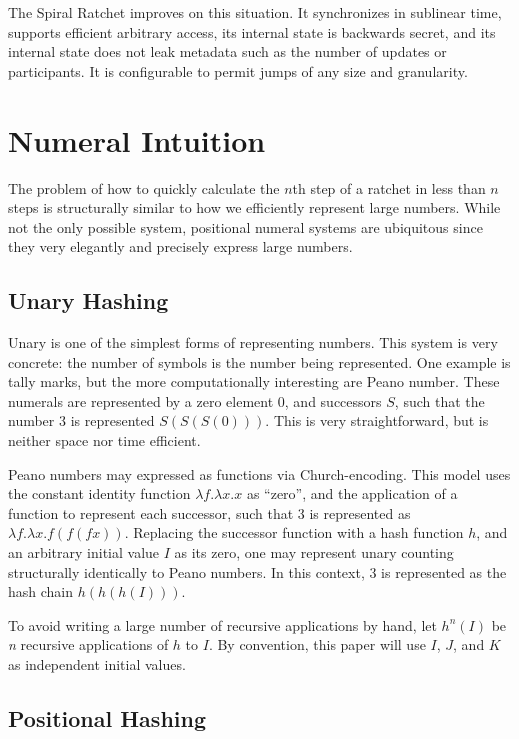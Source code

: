 \documentclass{article}
\begin{document}
    The Spiral Ratchet improves on this situation. It synchronizes in sublinear time, supports efficient arbitrary access, its internal state is backwards secret, and its internal state does not leak metadata such as the number of updates or participants. It is configurable to permit jumps of any size and granularity.
    
    \section{Numeral Intuition}
    
    The problem of how to quickly calculate the $n$th step of a ratchet in less than $n$ steps is structurally similar to how we efficiently represent large numbers. While not the only possible system, positional numeral systems are ubiquitous since they very elegantly and precisely express large numbers.
    
    \subsection{Unary Hashing}
   
    Unary is one of the simplest forms of representing numbers. This system is very concrete: the number of symbols is the number being represented. One example is tally marks, but the more computationally interesting are Peano number\cite{peano-wikipedia}. These numerals are represented by a zero element 0, and successors $S$, such that the number 3 is represented $S(S(S(0)))$. This is very straightforward, but is neither space nor time efficient. 
    
	Peano numbers may expressed as functions via Church-encoding\cite{tapl-church-numerals}. This model uses the constant identity function $\lambda{f}.\lambda{x}.x$ as ``zero'', and the application of a function to represent each successor, such that 3 is represented as $\lambda{f}.\lambda{x}.f(f(f x))$. Replacing the successor function with a hash function $h$, and an arbitrary initial value $I$ as its zero, one may represent unary counting structurally identically to Peano numbers. In this context, 3 is represented as the hash chain $h(h(h(I)))$.
	
    To avoid writing a large number of recursive applications by hand, let $h^n(I)$ be \emph{n} recursive applications of $h$ to $I$. By convention, this paper will use $I$, $J$, and $K$ as independent initial values.
    
    \subsection{Positional Hashing}
    
\end{document}
